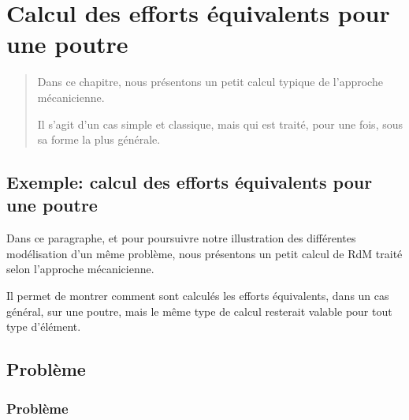 \ifVersionAvecExemplesSepares
   \chapter{Calcul des efforts équivalents pour une poutre}
   \begin{abstract}
   Dans ce chapitre, nous présentons un petit calcul typique de l'approche mécanicienne.

   Il s'agit d'un cas simple et classique, mais qui est traité, pour une fois, sous sa forme la
   plus générale.
   \end{abstract}
\else
   \section{Exemple: calcul des efforts équivalents pour une poutre}

   Dans ce paragraphe, et pour poursuivre notre illustration des différentes modélisation d'un même problème, nous présentons 
   un petit calcul de RdM traité selon l'approche mécanicienne.

   Il permet de montrer comment sont calculés les efforts équivalents, dans un cas général, sur une poutre, mais le
   même type de calcul resterait valable pour tout type d'élément.
\fi

\medskip
\ifVersionAvecExemplesSepares
   \section{Problème}
\else
   \subsection{Problème}
\fi

